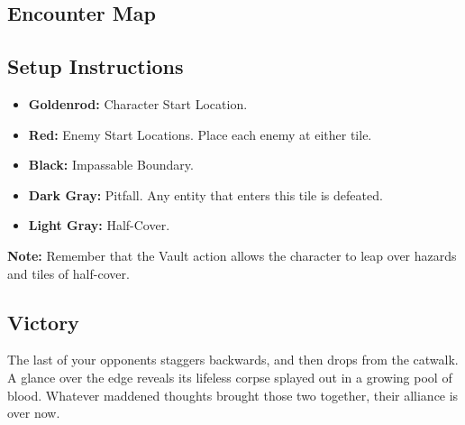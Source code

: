 \subsection*{Encounter Map}
\begin{center}
\end{center}

\subsection*{Setup Instructions}
\begin{itemize}
\item \textbf{Goldenrod:} Character Start Location.
\item \textbf{Red:} Enemy Start Locations. Place each enemy at either tile.
\item \textbf{Black:} Impassable Boundary.
\item \textbf{Dark Gray:} Pitfall. Any entity that enters this tile is defeated.
\item \textbf{Light Gray:} Half-Cover.
\end{itemize}

\begin{tcolorbox}
\textbf{Note:} Remember that the Vault action allows the character to leap over hazards and tiles of half-cover.
\end{tcolorbox}

\pagebreak

\subsection*{Victory}
The last of your opponents staggers backwards, and then drops from the catwalk. A glance over the edge reveals its lifeless corpse splayed out in a growing pool of blood. Whatever maddened thoughts brought those two together, their alliance is over now.\\

